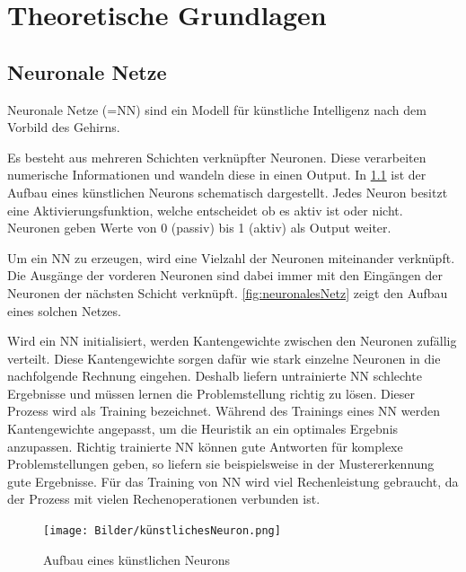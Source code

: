 

\clearpage
\chapter{Theoretische Grundlagen}
\section{Neuronale Netze}
Neuronale Netze (=NN) sind ein Modell für künstliche Intelligenz nach dem Vorbild des Gehirns.


Es besteht aus mehreren Schichten verknüpfter Neuronen. Diese verarbeiten numerische Informationen und wandeln diese in einen Output.  In \ref{fig:künstlichesNeuron} ist der Aufbau eines künstlichen Neurons schematisch dargestellt. Jedes Neuron besitzt eine Aktivierungsfunktion, welche entscheidet ob es aktiv ist oder nicht. Neuronen geben Werte von 0 (passiv) bis 1 (aktiv) als Output weiter. 

Um ein NN zu erzeugen, wird eine Vielzahl der Neuronen miteinander verknüpft. Die Ausgänge der vorderen Neuronen sind dabei immer mit den Eingängen der Neuronen der nächsten Schicht verknüpft. \ref{fig:neuronalesNetz} zeigt den Aufbau eines solchen Netzes. 

Wird ein NN initialisiert, werden Kantengewichte zwischen den Neuronen zufällig verteilt. Diese Kantengewichte sorgen dafür wie stark einzelne Neuronen in die nachfolgende Rechnung eingehen.
Deshalb liefern untrainierte NN schlechte Ergebnisse und müssen lernen die Problemstellung richtig zu lösen. Dieser Prozess wird als Training bezeichnet.
Während des Trainings eines NN werden Kantengewichte angepasst, um die Heuristik  an ein optimales Ergebnis anzupassen. Richtig trainierte NN können gute Antworten für komplexe Problemstellungen geben, so liefern sie beispielsweise in der Mustererkennung gute Ergebnisse.\cite{lorenz_reinforcement_2020}
Für das Training von NN wird viel Rechenleistung gebraucht, da der Prozess mit vielen Rechenoperationen verbunden ist.
\cite{ertel_grundkurs_2021}

\begin{figure}[!htb]
	\centering
	\texttt{[image: Bilder/künstlichesNeuron.png]}
	\caption{Aufbau eines künstlichen Neurons \cite{noauthor_kunstliche_nodate}}
    \label{fig:künstlichesNeuron}
\end{figure}

